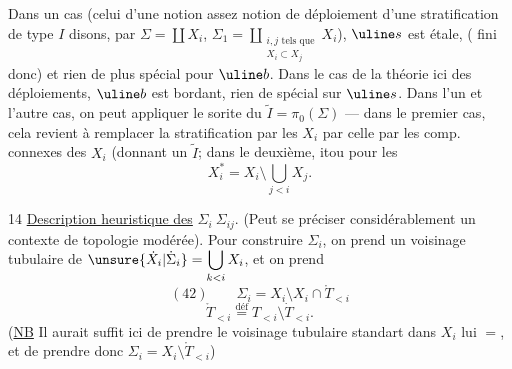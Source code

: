 
Dans un cas (celui d'une notion assez \unsure{)}
 notion de déploiement d'une stratification de type $I$ disons,
par $\Sigma=\coprod X_i$,
$\Sigma_1=\displaystyle\coprod_{\substack{i,j\text{ tels que}\\X_i\subset X_j}}X_i$),
$\uline s$ est étale, ( fini donc) et rien de plus spécial pour $\uline b$.
Dans le cas de la théorie 
ici des déploiements,
$\uline b$ est bordant, rien de spécial sur $\uline s$.
Dans l'un et l'autre cas, on peut appliquer le sorite
du $\widetilde I=\pi_0(\Sigma)$ --- dans le premier cas,
cela revient à remplacer la stratification par les $X_i$ par celle
par les comp. connexes des $X_i$ (donnant un $\widetilde I$;
dans le deuxième,
itou pour les
\[
X_i^{*}=X_i\setminus\bigcup_{j<i}X_j.
\]

14 \uline{Description heuristique des} $\Sigma_i\ \Sigma_{ij}$.
(Peut se préciser considérablement  un contexte de topologie modérée).
Pour construire $\Sigma_i$, on prend un voisinage tubulaire
  de
$\unsure{\dot X_i|\dot\Sigma_i}=\displaystyle\bigcup_{k<i}X_i$, et on prend
\[
(42)\qquad\Sigma_i=X_i\setminus X_i\cap\mathring T_{<i}
\]
\[
\mathring T_{<i}\overset{\mathrm{déf}}{=}T_{<i}\setminus\dot T_{<i}.
\]
(\uline{NB} Il aurait suffit ici de prendre le voisinage tubulaire
standart dans $X_i$ lui $=$, et de prendre donc
$\Sigma_i=X_i\setminus\mathring T_{<i}$)

